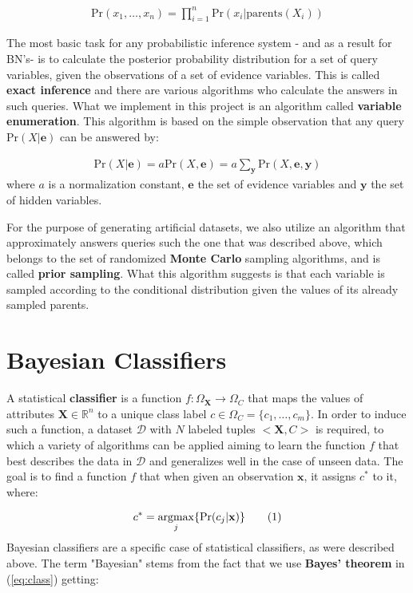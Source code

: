 \documentclass[11pt]{article}
\newcommand\numberthis{\addtocounter{equation}{1}\tag{\theequation}}
\DeclareMathOperator*{\argmax}{argmax} %
\begin{document}
	\begin{align*}
		\text{Pr}(x_1,\dots,x_n) = \prod_{i=1}^{n}\text{Pr}(x_i |  \text{parents}(X_i))
	\end{align*}
	
	The most basic task for any probabilistic inference system - and as a result for BN's- is to calculate the posterior probability distribution for a set of query variables, given the observations of a set of evidence variables. This is called \textbf{exact inference} and there are various algorithms who calculate the answers in such queries. What we implement in this project is an algorithm called \textbf{variable enumeration}. This algorithm is based on the simple observation that any query $\text{Pr}(X|\mathbf{e})$ can be answered by:
	
	\begin{align*}
		\text{Pr}(X|\mathbf{e}) = a\text{Pr}(X,\mathbf{e}) = a\sum_{\mathbf{y}}\text{Pr}(X,\mathbf{e},\mathbf{y})
	\end{align*}
	where $a$ is a normalization constant, $\mathbf{e}$ the set of evidence variables and $\mathbf{y}$ the set of hidden variables.
	\par
	For the purpose of generating artificial datasets, we also utilize an algorithm that approximately answers queries such the one that was described above, which belongs to the set of randomized \textbf{Monte Carlo} sampling algorithms, and is called \textbf{prior sampling}. What this algorithm suggests is that each variable is sampled according to the conditional distribution given the values of its already sampled parents.
	\section{Bayesian Classifiers \label{sec:bayesian_classifiers}}	
	A statistical \textbf{classifier} is a function $f:\Omega_\mathbf{X} \rightarrow \Omega_C$ that maps the values of attributes $\mathbf{X} \in \mathbb{R}^n$ to a unique class label $c \in \Omega_C = \{c_1,\dots,c_m\}$. In order to induce such a function, a dataset $\mathcal{D}$ with $N$ labeled tuples $<\mathbf{X}, C>$ is required, to which a variety of algorithms can be applied aiming to learn the function $f$ that best describes the data in $\mathcal{D}$ and generalizes well in the case of unseen data. The goal is to find a function $f$ that when given an observation $\mathbf{x}$, it assigns $c^*$ to it, where:
	
	\begin{align*}
		c^* = \argmax_j\{\text{Pr}(c_j|\mathbf{x})\} \numberthis \label{eq:class}
	\end{align*}
	Bayesian classifiers are a specific case of statistical classifiers, as were described above. The term "Bayesian" stems from the fact that we use \textbf{Bayes' theorem} in (\ref{eq:class}) getting:
	
\end{document}
